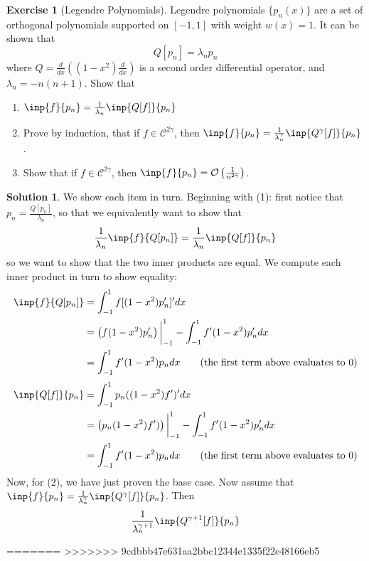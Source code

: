 \documentclass[12pt]{article}
\theoremstyle{definition}
\newtheorem{exercise}{\color{YellowOrange}Exercise}
\theoremstyle{definition}
\newtheorem{solution}{\color{Goldenrod}Solution}
\begin{document}
\begin{exercise}[Legendre Polynomials]
	Legendre polynomials $\{p_n(x)\}$ are a set of orthogonal polynomials supported on $[-1,1]$ with weight $w(x) = 1$. It can be shown that 
	\begin{equation}
		Q[p_n] = \lambda_np_n
	\end{equation}
	where $Q = \frac{d}{dx}\left((1-x^2)\frac{d}{dx}\right)$ is a second order differential operator, and $\lambda_n = -n(n+1)$. Show that
	\begin{enumerate}
		\item $\inp{f}{p_n} = \frac{1}{\lambda_n} \inp{Q[f]}{p_n}$
		\item Prove by induction, that if $f \in \mathcal{C}^{2\gamma}$, then $\inp{f}{p_n} = \frac{1}{\lambda_n^\gamma} \inp{Q^\gamma[f]}{p_n}$.
		\item Show that if $f \in \mathcal{C}^{2\gamma}$, then $\inp{f}{p_n} = \mathcal{O}\left(\frac{1}{n^{2\gamma}}\right)$.
	\end{enumerate}
\end{exercise}
\begin{solution}
	We show each item in turn. Beginning with (1): first notice that $p_n = \frac{Q[p_n]}{\lambda_n}$, so that we equivalently want to show that
	\begin{equation}
		\frac{1}{\lambda_n} \inp{f}{Q[p_n]} = \frac{1}{\lambda_n}\inp{Q[f]}{p_n}
	\end{equation}
	so we want to show that the two inner products are equal. We compute each inner product in turn to show equality:
	\begin{align*}
		\inp{f}{Q[p_n]} &= \int_{-1}^1 f [(1-x^2)p_n']' dx \\
		&= \left(f(1-x^2)p_n'\right)\bigg\vert_{-1}^1 - \int_{-1}^1 f' (1-x^2)p_n' dx \\
		&= \int_{-1}^1 f' (1-x^2)p_n dx \tag{the first term above evaluates to $0$}
	\end{align*}
	\begin{align*}
		\inp{Q[f]}{p_n} &= \int_{-1}^1 p_n ((1-x^2)f')' dx \\
		&= \left(p_n(1-x^2)f')\right)\bigg\vert_{-1}^1 - \int_{-1}^1 f' (1-x^2)p_n' dx \\
		&= \int_{-1}^1 f' (1-x^2)p_n dx \tag{the first term above evaluates to $0$}
	\end{align*}
	Now, for (2), we have just proven the base case. Now assume that $\inp{f}{p_n} = \frac{1}{\lambda_n^\gamma} \inp{Q^\gamma[f]}{p_n}$. Then
	\begin{align*}
		 \frac{1}{\lambda_n^{\gamma+1}} \inp{Q^{\gamma+1}[f]}{p_n}
	\end{align*}
\end{solution}

=======
>>>>>>> 9cdbbb47e631aa2bbc12344e1335f22e48166eb5
\end{document}

